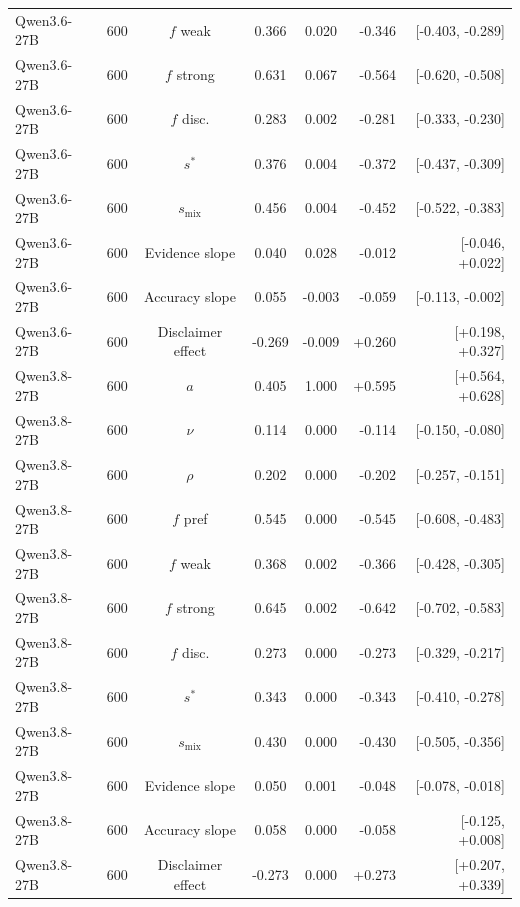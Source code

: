 \documentclass[10pt,a4paper]{article}
\begin{document}
\begin{scriptsize}
\begin{longtable}{llcccrr}
Qwen3.6-27B & 600 & $f$ weak & 0.366 & 0.020 & -0.346 & [-0.403, -0.289] \\
Qwen3.6-27B & 600 & $f$ strong & 0.631 & 0.067 & -0.564 & [-0.620, -0.508] \\
Qwen3.6-27B & 600 & $f$ disc. & 0.283 & 0.002 & -0.281 & [-0.333, -0.230] \\
Qwen3.6-27B & 600 & $s^{*}$ & 0.376 & 0.004 & -0.372 & [-0.437, -0.309] \\
Qwen3.6-27B & 600 & $s_{\mathrm{mix}}$ & 0.456 & 0.004 & -0.452 & [-0.522, -0.383] \\
Qwen3.6-27B & 600 & Evidence slope & 0.040 & 0.028 & -0.012 & [-0.046, +0.022] \\
Qwen3.6-27B & 600 & Accuracy slope & 0.055 & -0.003 & -0.059 & [-0.113, -0.002] \\
Qwen3.6-27B & 600 & Disclaimer effect & -0.269 & -0.009 & +0.260 & [+0.198, +0.327] \\
Qwen3.8-27B & 600 & $a$ & 0.405 & 1.000 & +0.595 & [+0.564, +0.628] \\
Qwen3.8-27B & 600 & $\nu$ & 0.114 & 0.000 & -0.114 & [-0.150, -0.080] \\
Qwen3.8-27B & 600 & $\rho$ & 0.202 & 0.000 & -0.202 & [-0.257, -0.151] \\
Qwen3.8-27B & 600 & $f$ pref & 0.545 & 0.000 & -0.545 & [-0.608, -0.483] \\
Qwen3.8-27B & 600 & $f$ weak & 0.368 & 0.002 & -0.366 & [-0.428, -0.305] \\
Qwen3.8-27B & 600 & $f$ strong & 0.645 & 0.002 & -0.642 & [-0.702, -0.583] \\
Qwen3.8-27B & 600 & $f$ disc. & 0.273 & 0.000 & -0.273 & [-0.329, -0.217] \\
Qwen3.8-27B & 600 & $s^{*}$ & 0.343 & 0.000 & -0.343 & [-0.410, -0.278] \\
Qwen3.8-27B & 600 & $s_{\mathrm{mix}}$ & 0.430 & 0.000 & -0.430 & [-0.505, -0.356] \\
Qwen3.8-27B & 600 & Evidence slope & 0.050 & 0.001 & -0.048 & [-0.078, -0.018] \\
Qwen3.8-27B & 600 & Accuracy slope & 0.058 & 0.000 & -0.058 & [-0.125, +0.008] \\
Qwen3.8-27B & 600 & Disclaimer effect & -0.273 & 0.000 & +0.273 & [+0.207, +0.339] \\
\end{longtable}
\end{scriptsize}
\end{document}
